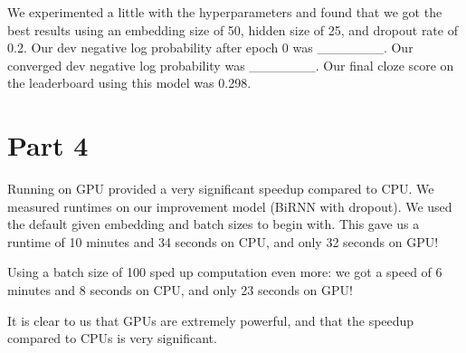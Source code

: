 \documentclass{article}
\begin{document}
We experimented a little with the hyperparameters and found that we got the best results using an embedding size of 50, hidden size of 25, and dropout rate of 0.2. Our dev negative log probability after epoch 0 was _______. Our converged dev negative log probability was _______. Our final cloze score on the leaderboard using this model was 0.298. 

\section{Part 4}

Running on GPU provided a very significant speedup compared to CPU. We measured runtimes on our improvement model (BiRNN with dropout). We used the default given embedding and batch sizes to begin with. This gave us a runtime of 10 minutes and 34 seconds on CPU, and only 32 seconds on GPU!

Using a batch size of 100 sped up computation even more: we got a speed of 6 minutes and 8 seconds on CPU, and only 23 seconds on GPU!

It is clear to us that GPUs are extremely powerful, and that the speedup compared to CPUs is very significant.
\end{document}
